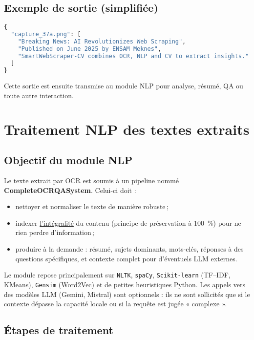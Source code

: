 \documentclass[12pt,a4paper]{report}
\begin{document}
\section{Exemple de sortie (simplifiée)}

\begin{lstlisting}[language=Python]
{
  "capture_37a.png": [
    "Breaking News: AI Revolutionizes Web Scraping",
    "Published on June 2025 by ENSAM Meknes",
    "SmartWebScraper-CV combines OCR, NLP and CV to extract insights."
  ]
}
\end{lstlisting}

Cette sortie est ensuite transmise au module NLP pour analyse, résumé, QA ou toute autre interaction.

\chapter{Traitement NLP des textes extraits}

\section{Objectif du module NLP}

Le texte extrait par OCR est soumis à un pipeline nommé \textbf{CompleteOCRQASystem}.  
Celui-ci doit :

\begin{itemize}
  \item nettoyer et normaliser le texte de manière robuste\,;
  \item indexer \underline{l’intégralité} du contenu (principe de préservation à 100~\%) pour ne rien perdre d’information\,;
  \item produire à la demande : résumé, sujets dominants, mots-clés, réponses à des questions spécifiques, et contexte complet pour d’éventuels LLM externes.
\end{itemize}

Le module repose principalement sur \texttt{NLTK}, \texttt{spaCy}, \texttt{Scikit-learn} (TF–IDF, KMeans), \texttt{Gensim} (Word2Vec) et de petites heuristiques Python. Les appels vers des modèles LLM (Gemini, Mistral) sont optionnels : ils ne sont sollicités que si le contexte dépasse la capacité locale ou si la requête est jugée « complexe ».

\section{Étapes de traitement}
\end{document}
